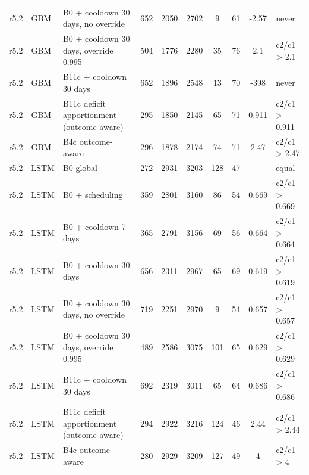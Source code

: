 \begin{longtable}{llp{4.6cm}ccccccl}
r5.2 & GBM & B0 + cooldown 30 days, no override & 652 & 2050 & 2702 & 9 & 61 & -2.57 & never \\
r5.2 & GBM & B0 + cooldown 30 days, override 0.995 & 504 & 1776 & 2280 & 35 & 76 & 2.1 & c2/c1 > 2.1 \\
r5.2 & GBM & B11c + cooldown 30 days & 652 & 1896 & 2548 & 13 & 70 & -398 & never \\
r5.2 & GBM & B11c deficit apportionment (outcome-aware) & 295 & 1850 & 2145 & 65 & 71 & 0.911 & c2/c1 > 0.911 \\
r5.2 & GBM & B4c outcome-aware & 296 & 1878 & 2174 & 74 & 71 & 2.47 & c2/c1 > 2.47 \\
r5.2 & LSTM & B0 global & 272 & 2931 & 3203 & 128 & 47 &  & equal \\
r5.2 & LSTM & B0 + scheduling & 359 & 2801 & 3160 & 86 & 54 & 0.669 & c2/c1 > 0.669 \\
r5.2 & LSTM & B0 + cooldown 7 days & 365 & 2791 & 3156 & 69 & 56 & 0.664 & c2/c1 > 0.664 \\
r5.2 & LSTM & B0 + cooldown 30 days & 656 & 2311 & 2967 & 65 & 69 & 0.619 & c2/c1 > 0.619 \\
r5.2 & LSTM & B0 + cooldown 30 days, no override & 719 & 2251 & 2970 & 9 & 54 & 0.657 & c2/c1 > 0.657 \\
r5.2 & LSTM & B0 + cooldown 30 days, override 0.995 & 489 & 2586 & 3075 & 101 & 65 & 0.629 & c2/c1 > 0.629 \\
r5.2 & LSTM & B11c + cooldown 30 days & 692 & 2319 & 3011 & 65 & 64 & 0.686 & c2/c1 > 0.686 \\
r5.2 & LSTM & B11c deficit apportionment (outcome-aware) & 294 & 2922 & 3216 & 124 & 46 & 2.44 & c2/c1 > 2.44 \\
r5.2 & LSTM & B4c outcome-aware & 280 & 2929 & 3209 & 127 & 49 & 4 & c2/c1 > 4 \\
\bottomrule
\end{longtable}

